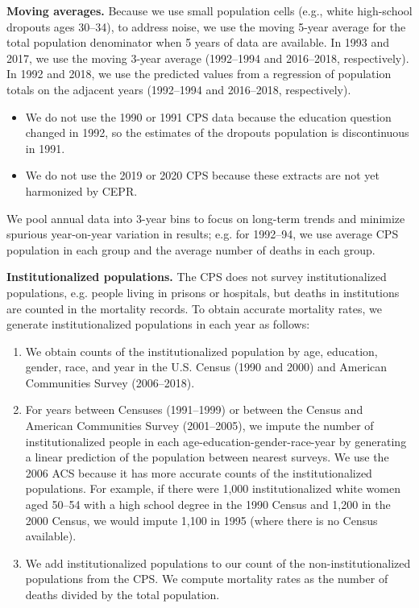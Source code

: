 \textbf{Moving averages.} Because we use
small population cells (e.g., white high-school dropouts ages 30--34),
to address noise, we use the moving 5-year average for the total population
denominator when 5 years of data are available. In 1993 and 2017, we
use the moving 3-year average (1992--1994 and 2016--2018,
respectively). In 1992 and 2018, we use the predicted values from a
regression of population totals on the adjacent years (1992--1994 and
2016--2018, respectively). 
\begin{itemize}
\item We do not use the 1990 or 1991 CPS data because
the education question changed in 1992, so the estimates of the
dropouts population is discontinuous in 1991. 
\item We do not use the 2019 or 2020 CPS because these extracts are
  not yet harmonized by CEPR. 
\end{itemize} 
We pool annual data into 3-year bins to focus on long-term trends and minimize spurious year-on-year variation in results; e.g. for 1992--94, we use average CPS population in each group and the average number of deaths in each group.

\textbf{Institutionalized populations.} The CPS does not survey
institutionalized populations, e.g. people living in prisons or
hospitals, but deaths in institutions are counted in the mortality
records. To obtain accurate mortality rates, we generate
institutionalized populations in each year as follows:
\begin{enumerate} 
\item We obtain counts of the institutionalized population by age,
  education, gender, race, and year in the
  U.S. Census (1990 and 2000) and American Communities Survey
  (2006--2018). 
\item For years between Censuses (1991--1999) or between the Census
  and American Communities Survey (2001--2005), we impute the
  number of institutionalized people in each
  age-education-gender-race-year by generating a linear prediction of the
  population between nearest surveys. We use the 2006 ACS because it
  has more accurate counts of the institutionalized populations. For example, if there were 1,000
  institutionalized white women aged 50--54 with a high school degree in
  the 1990 Census and 1,200 in the 2000 Census, we would impute 1,100 in
  1995 (where there is no Census available). 
\item We add institutionalized populations to our count of the
  non-institutionalized populations from the CPS. We compute mortality
  rates as the number of deaths divided by the total population. 
\end{enumerate}

